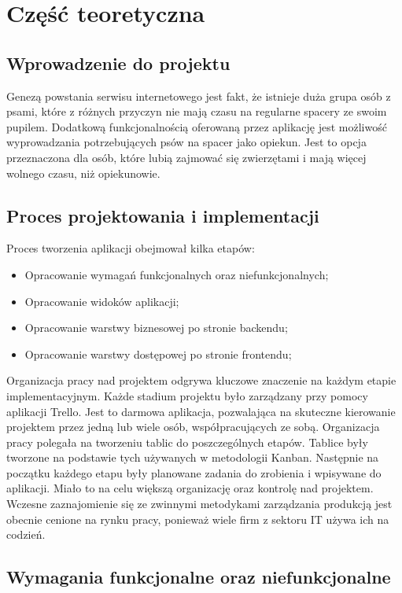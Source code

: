 \chapter{Część teoretyczna}
\section{Wprowadzenie do projektu}
Genezą powstania serwisu internetowego jest fakt, że istnieje duża grupa osób z psami, które z różnych przyczyn nie mają czasu na regularne spacery ze swoim pupilem. Dodatkową funkcjonalnością oferowaną przez aplikację jest możliwość wyprowadzania potrzebujących psów na spacer jako opiekun. Jest to opcja przeznaczona dla osób, które lubią zajmować się zwierzętami i mają więcej wolnego czasu, niż opiekunowie.

\section{Proces projektowania i implementacji}
Proces tworzenia aplikacji obejmował kilka etapów:
\begin{itemize}
    \item Opracowanie wymagań funkcjonalnych oraz niefunkcjonalnych;
    \item Opracowanie widoków aplikacji;
    \item Opracowanie warstwy biznesowej po stronie backendu;
    \item Opracowanie warstwy dostępowej po stronie frontendu;
\end{itemize}

Organizacja pracy nad projektem odgrywa kluczowe znaczenie na każdym etapie implementacyjnym. Każde stadium projektu było zarządzany przy pomocy aplikacji Trello. Jest to darmowa aplikacja, pozwalająca na skuteczne kierowanie projektem przez jedną lub wiele osób, współpracujących ze sobą. Organizacja pracy polegała na tworzeniu tablic do poszczególnych etapów. Tablice były tworzone na podstawie tych używanych w metodologii Kanban. Następnie na początku każdego etapu były planowane zadania do zrobienia i wpisywane do aplikacji. Miało to na celu większą organizację oraz kontrolę nad projektem. Wczesne zaznajomienie się ze zwinnymi metodykami zarządzania produkcją jest obecnie cenione na rynku pracy, ponieważ wiele firm z sektoru IT używa ich na codzień.
\section{Wymagania funkcjonalne oraz niefunkcjonalne}

